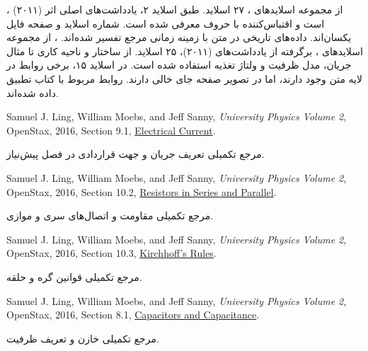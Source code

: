 ، از مجموعه اسلایدهای ، ۲۷ اسلاید.
طبق اسلاید ۲، یادداشت‌های اصلی اثر  (۲۰۱۱) است و
اقتباس‌کننده با حروف  معرفی شده است. شماره اسلاید و صفحه فایل یکسان‌اند.
داده‌های تاریخی در متن با زمینه زمانی مرجع تفسیر شده‌اند.
، از مجموعه اسلایدهای ،
برگرفته از یادداشت‌های  (۲۰۱۱)، ۲۵ اسلاید.
از ساختار و ناحیه کاری تا مثال جریان، مدل ظرفیت و ولتاژ تغذیه استفاده شده است.
در اسلاید ۱۵، برخی روابط در لایه متن وجود دارند، اما در تصویر صفحه جای خالی دارند.
روابط مربوط با کتاب تطبیق داده شده‌اند.
\begin{latin}
Samuel J. Ling, William Moebs, and Jeff Sanny, \textit{University Physics Volume 2},
OpenStax, 2016, Section 9.1,
\href{https://openstax.org/books/university-physics-volume-2/pages/9-1-electrical-current}{Electrical Current}.
\end{latin}
\nopagebreak[4]
مرجع تکمیلی تعریف جریان و جهت قراردادی در فصل پیش‌نیاز.
\begin{latin}
Samuel J. Ling, William Moebs, and Jeff Sanny, \textit{University Physics Volume 2},
OpenStax, 2016, Section 10.2,
\href{https://openstax.org/books/university-physics-volume-2/pages/10-2-resistors-in-series-and-parallel}{Resistors in Series and Parallel}.
\end{latin}
\nopagebreak[4]
مرجع تکمیلی مقاومت و اتصال‌های سری و موازی.
\begin{latin}
Samuel J. Ling, William Moebs, and Jeff Sanny, \textit{University Physics Volume 2},
OpenStax, 2016, Section 10.3,
\href{https://openstax.org/books/university-physics-volume-2/pages/10-3-kirchhoffs-rules}{Kirchhoff's Rules}.
\end{latin}
\nopagebreak[4]
مرجع تکمیلی قوانین گره و حلقه.
\begin{latin}
Samuel J. Ling, William Moebs, and Jeff Sanny, \textit{University Physics Volume 2},
OpenStax, 2016, Section 8.1,
\href{https://openstax.org/books/university-physics-volume-2/pages/8-1-capacitors-and-capacitance}{Capacitors and Capacitance}.
\end{latin}
\nopagebreak[4]
مرجع تکمیلی خازن و تعریف ظرفیت.
